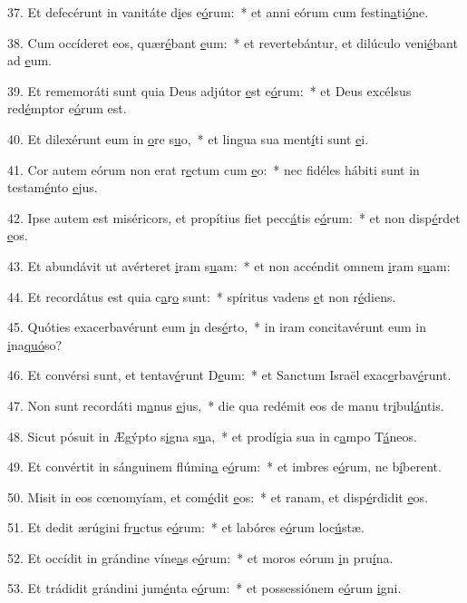 37. Et defecérunt in vanitáte d\uline{i}es e\uline{ó}rum:~* et anni eórum cum festin\uline{a}ti\uline{ó}ne.\par 
38. Cum occíderet eos, quær\uline{é}bant \uline{e}um:~* et revertebántur, et dilúculo veni\uline{é}bant ad \uline{e}um.\par 
39. Et rememoráti sunt quia Deus adjútor \uline{e}st e\uline{ó}rum:~* et Deus excélsus red\uline{é}mptor e\uline{ó}rum est.\par 
40. Et dilexérunt eum in \uline{o}re s\uline{u}o,~* et lingua sua ment\uline{í}ti sunt \uline{e}i.\par 
41. Cor autem eórum non erat r\uline{e}ctum cum \uline{e}o:~* nec fidéles hábiti sunt in testam\uline{é}nto \uline{e}jus.\par 
42. Ipse autem est miséricors, et propítius fiet pecc\uline{á}tis e\uline{ó}rum:~* et non disp\uline{é}rdet \uline{e}os.\par 
43. Et abundávit ut avérteret \uline{i}ram s\uline{u}am:~* et non accéndit omnem \uline{i}ram s\uline{u}am:\par 
44. Et recordátus est quia c\uline{a}r\uline{o} sunt:~* spíritus vadens \uline{e}t non r\uline{é}diens.\par 
45. Quóties exacerbavérunt eum \uline{i}n des\uline{é}rto,~* in iram concitavérunt eum in \uline{i}na\uline{quó}so?\par 
46. Et convérsi sunt, et tentav\uline{é}runt D\uline{e}um:~* et Sanctum Israël exac\uline{e}rbav\uline{é}runt.\par 
47. Non sunt recordáti m\uline{a}nus \uline{e}jus,~* die qua redémit eos de manu tr\uline{i}bul\uline{á}ntis.\par 
48. Sicut pósuit in Ægýpto s\uline{i}gna s\uline{u}a,~* et prodígia sua in c\uline{a}mpo T\uline{á}neos.\par 
49. Et convértit in sánguinem flúmin\uline{a} e\uline{ó}rum:~* et imbres e\uline{ó}rum, ne b\uline{í}berent.\par 
50. Misit in eos cœnomyíam, et com\uline{é}dit \uline{e}os:~* et ranam, et disp\uline{é}rdidit \uline{e}os.\par 
51. Et dedit ærúgini fr\uline{u}ctus e\uline{ó}rum:~* et labóres e\uline{ó}rum loc\uline{ú}stæ.\par 
52. Et occídit in grándine víne\uline{a}s e\uline{ó}rum:~* et moros eórum \uline{i}n pru\uline{í}na.\par 
53. Et trádidit grándini jum\uline{é}nta e\uline{ó}rum:~* et possessiónem e\uline{ó}rum \uline{i}gni.\par 
